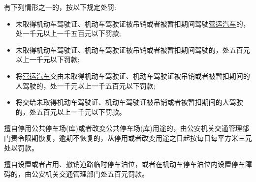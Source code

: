 \noindent 有下列情形之一的，按以下规定处罚:

\begin{itemize}
    \item 未取得机动车驾驶证、机动车驾驶证被吊销或者被暂扣期间驾驶\uline{营运汽车}的，处一千元以上一千五百元以下罚款;
    \item 未取得机动车驾驶证、机动车驾驶证被吊销或者被暂扣期间驾驶的，处五百元以上一千元以下罚款;
    \item 将\uline{营运汽车}交由未取得机动车驾驶证、机动车驾驶证被吊销或者被暂扣期间的人驾驶的，处一千元以上一千五百元以下罚款;
    \item 将交给未取得机动车驾驶证、机动车驾驶证被吊销或者被暂扣期间的人驾驶的，处五百元以上一千元以下罚款。
\end{itemize}

\vspace{0.5em} %
\noindent\textcolor{gray}{\hrulefill} %
\vspace{0.5em} %

擅自停用公共停车场(库)或者改变公共停车场(库)用途的，由公安机关交通管理部门责令限期恢复，逾期不恢复的，从停用或者改变用途之日起按每日每平方米三元处以罚款。

擅自设置或者占用、撤销道路临时停车泊位，或者在机动车停车泊位内设置停车障碍的，由公安机关交通管理部门处五百元罚款。